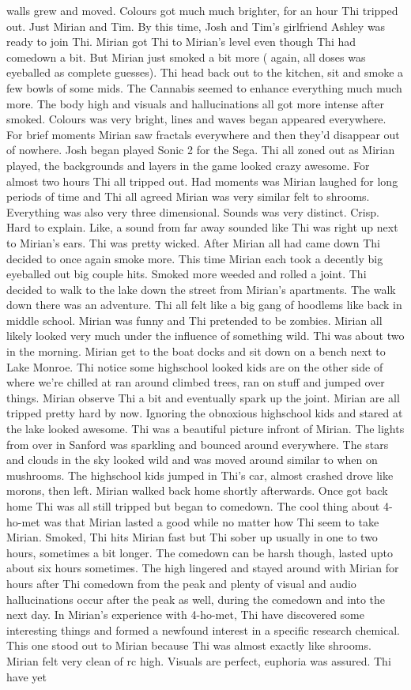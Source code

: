 \documentclass[12pt]{book}
\begin{document}
walls grew and moved. Colours got much much brighter, for an hour Thi tripped out. Just Mirian and Tim. By this time, Josh and Tim's girlfriend Ashley was ready to join Thi. Mirian got Thi to Mirian's level even though Thi had comedown a bit. But Mirian just smoked a bit more ( again, all doses was eyeballed as complete guesses). Thi head back out to the kitchen, sit and smoke a few bowls of some mids. The Cannabis seemed to enhance everything much much more. The body high and visuals and hallucinations all got more intense after smoked. Colours was very bright, lines and waves began appeared everywhere. For brief moments Mirian saw fractals everywhere and then they'd disappear out of nowhere. Josh began played Sonic 2 for the Sega. Thi all zoned out as Mirian played, the backgrounds and layers in the game looked crazy awesome. For almost two hours Thi all tripped out. Had moments was Mirian laughed for long periods of time and Thi all agreed Mirian was very similar felt to shrooms. Everything was also very three dimensional. Sounds was very distinct. Crisp. Hard to explain. Like, a sound from far away sounded like Thi was right up next to Mirian's ears. Thi was pretty wicked. After Mirian all had came down Thi decided to once again smoke more. This time Mirian each took a decently big eyeballed out big couple hits. Smoked more weeded and rolled a joint. Thi decided to walk to the lake down the street from Mirian's apartments. The walk down there was an adventure. Thi all felt like a big gang of hoodlems like back in middle school. Mirian was funny and Thi pretended to be zombies. Mirian all likely looked very much under the influence of something wild. Thi was about two in the morning. Mirian get to the boat docks and sit down on a bench next to Lake Monroe. Thi notice some highschool looked kids are on the other side of where we're chilled at ran around climbed trees, ran on stuff and jumped over things. Mirian observe Thi a bit and eventually spark up the joint. Mirian are all tripped pretty hard by now. Ignoring the obnoxious highschool kids and stared at the lake looked awesome. Thi was a beautiful picture infront of Mirian. The lights from over in Sanford was sparkling and bounced around everywhere. The stars and clouds in the sky looked wild and was moved around similar to when on mushrooms. The highschool kids jumped in Thi's car, almost crashed drove like morons, then left. Mirian walked back home shortly afterwards. Once got back home Thi was all still tripped but began to comedown. The cool thing about 4-ho-met was that Mirian lasted a good while no matter how Thi seem to take Mirian. Smoked, Thi hits Mirian fast but Thi sober up usually in one to two hours, sometimes a bit longer. The comedown can be harsh though, lasted upto about six hours sometimes. The high lingered and stayed around with Mirian for hours after Thi comedown from the peak and plenty of visual and audio hallucinations occur after the peak as well, during the comedown and into the next day. In Mirian's experience with 4-ho-met, Thi have discovered some interesting things and formed a newfound interest in a specific research chemical. This one stood out to Mirian because Thi was almost exactly like shrooms. Mirian felt very clean of rc high. Visuals are perfect, euphoria was assured. Thi have yet 
\end{document}
